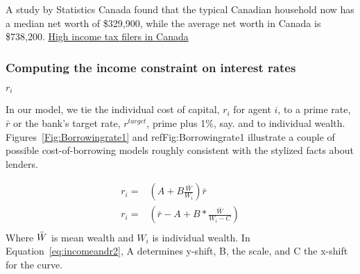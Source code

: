  A study by Statistics Canada found that the typical Canadian household now has a median net worth of \$329,900, while the average net worth in Canada is \$738,200. \href{https://www150.statcan.gc.ca/t1/tbl1/en/tv.action?pid=1110005501}{High income tax filers in Canada}

\subsubsection{Computing the income constraint on interest rates}\label{SS:YWealthConstraint}
$r_i$

In our model, we  tie the individual cost of capital,  $r_i$ for agent $i$, to a prime rate, $\bar r$ or the bank's target rate, $r^{target}$, prime plus 1\%, say. and to individual wealth. Figures~\ref{Fig:Borrowingrate1} and ref{Fig:Borrowingrate1} illustrate a couple of possible  cost-of-borrowing models roughly consistent  with the stylized facts about lenders. 

\begin{align}
 r_i =  &  \left(A + B \frac{\bar{W}}{W_i}\right) \bar r       \label{eq:incomeandr1}  \\
 r_i =  &  \left(\bar r - A + B *\frac{\bar W}{W_i - C}\right) \label{eq:incomeandr2}  \\
\end{align}
Where $\Bar{W}$ is mean wealth and $W_i$ is individual wealth. In Equation~\ref{eq:incomeandr2},  A determines y-shift, B, the scale, and C the  x-shift for the curve.


